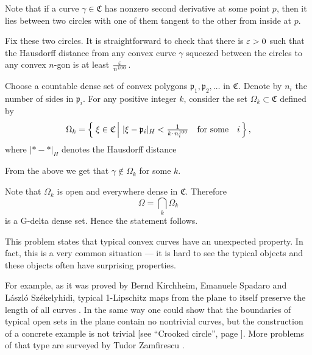 Note that if a curve $\gamma\in\mathfrak{C}$ 
has nonzero second derivative at some point $p$,
then it lies between two circles with one of them tangent to the other from inside at $p$.

Fix these two circles.
It is straightforward to check that there is $\varepsilon>0$ such that 
the Hausdorff distance from any convex curve $\gamma$ squeezed between the circles 
to any convex $n$-gon is at least $\frac{\varepsilon}{n^{100}}$.

Choose a countable dense set of convex polygons $\mathfrak{p}_1,\mathfrak{p}_2,\dots$ in $\mathfrak{C}$.
Denote by $n_i$ the number of sides in $\mathfrak{p}_i$.
For any positive integer $k$,
consider the set $\Omega_k\subset\mathfrak{C}$ defined by 
\[\Omega_k
=
\set{\xi\in \mathfrak{C}}{|\xi-\mathfrak{p}_i|_{H}<\tfrac1{k\cdot n_i^{100}}\quad\text{for some}\quad i},\]
where $|{*}-{*}|_H$ denotes the Hausdorff distance 

From the above we get that $\gamma\notin\Omega_k$ for some $k$. 

Note that $\Omega_k$ is open and everywhere dense in $\mathfrak{C}$.
Therefore 
\[\Omega=\bigcap_k\Omega_k\]
is a G-delta dense set.
Hence the statement follows.\qeds

This problem states that typical convex curves have an unexpected property.
In fact, this is a very common situation --- it is hard to see the typical objects and these objects often have surprising properties.

For example, as it was proved by
Bernd Kirchheim, 
Emanuele Spadaro 
and 
L{\'a}szl{\'o} Sz{\'e}kelyhidi,
typical 1-Lipschitz maps from the plane to itself preserve the length of all curves \cite{KSS}.
In the same way one could show that the boundaries of typical open sets in the plane contain no nontrivial curves, 
but the construction of a concrete example is not trivial
[see ``Crooked circle'', page \pageref{Crooked circle}].
More problems of that type are surveyed by Tudor Zamfirescu \cite{zamfirescu}.







